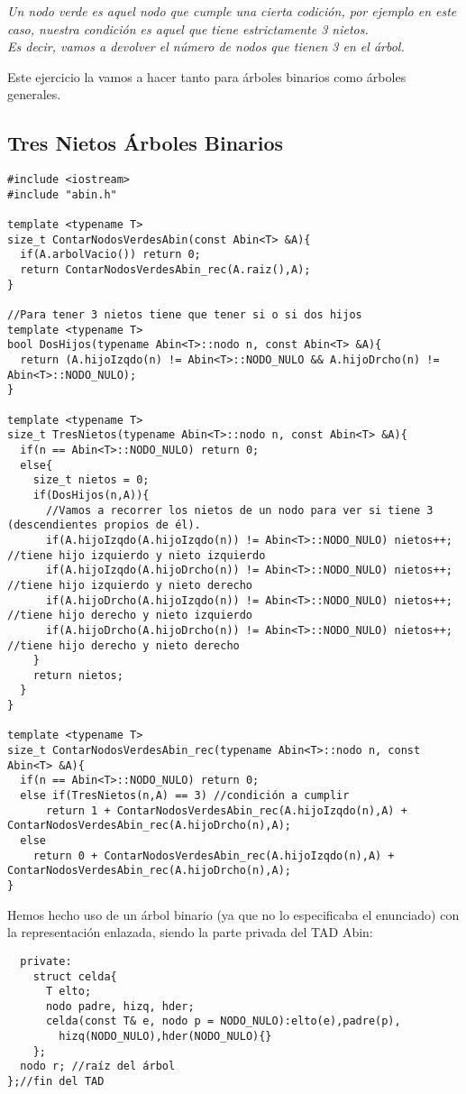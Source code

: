 \textbf{}\textit{ Un nodo verde es aquel nodo que cumple una cierta codición, por ejemplo en este caso, nuestra condición es aquel que tiene estrictamente 3 nietos.\\ Es decir, vamos a devolver el número de nodos que tienen 3 en el árbol.}

Este ejercicio la vamos a hacer tanto para árboles binarios como árboles generales.
\subsection*{Tres Nietos Árboles Binarios}

\begin{verbatim}
#include <iostream>
#include "abin.h"

template <typename T>
size_t ContarNodosVerdesAbin(const Abin<T> &A){
  if(A.arbolVacio()) return 0;
  return ContarNodosVerdesAbin_rec(A.raiz(),A);
}

//Para tener 3 nietos tiene que tener si o si dos hijos
template <typename T>
bool DosHijos(typename Abin<T>::nodo n, const Abin<T> &A){
  return (A.hijoIzqdo(n) != Abin<T>::NODO_NULO && A.hijoDrcho(n) != Abin<T>::NODO_NULO);
}

template <typename T>
size_t TresNietos(typename Abin<T>::nodo n, const Abin<T> &A){
  if(n == Abin<T>::NODO_NULO) return 0;
  else{
    size_t nietos = 0;
    if(DosHijos(n,A)){
      //Vamos a recorrer los nietos de un nodo para ver si tiene 3 (descendientes propios de él).
      if(A.hijoIzqdo(A.hijoIzqdo(n)) != Abin<T>::NODO_NULO) nietos++; //tiene hijo izquierdo y nieto izquierdo
      if(A.hijoIzqdo(A.hijoDrcho(n)) != Abin<T>::NODO_NULO) nietos++; //tiene hijo izquierdo y nieto derecho
      if(A.hijoDrcho(A.hijoIzqdo(n)) != Abin<T>::NODO_NULO) nietos++; //tiene hijo derecho y nieto izquierdo
      if(A.hijoDrcho(A.hijoDrcho(n)) != Abin<T>::NODO_NULO) nietos++; //tiene hijo derecho y nieto derecho
    }
    return nietos;
  }
}

template <typename T>
size_t ContarNodosVerdesAbin_rec(typename Abin<T>::nodo n, const Abin<T> &A){
  if(n == Abin<T>::NODO_NULO) return 0;
  else if(TresNietos(n,A) == 3) //condición a cumplir
      return 1 + ContarNodosVerdesAbin_rec(A.hijoIzqdo(n),A) + ContarNodosVerdesAbin_rec(A.hijoDrcho(n),A);
  else
    return 0 + ContarNodosVerdesAbin_rec(A.hijoIzqdo(n),A) + ContarNodosVerdesAbin_rec(A.hijoDrcho(n),A);
}
\end{verbatim}

Hemos hecho uso de un árbol binario (ya que no lo especificaba el enunciado) con la representación enlazada, siendo la parte privada del TAD Abin:
\begin{center}
  \begin{verbatim}
  private:
    struct celda{
      T elto;
      nodo padre, hizq, hder;
      celda(const T& e, nodo p = NODO_NULO):elto(e),padre(p),
        hizq(NODO_NULO),hder(NODO_NULO){}
    };
  nodo r; //raíz del árbol
};//fin del TAD
  \end{verbatim}
\end{center}

